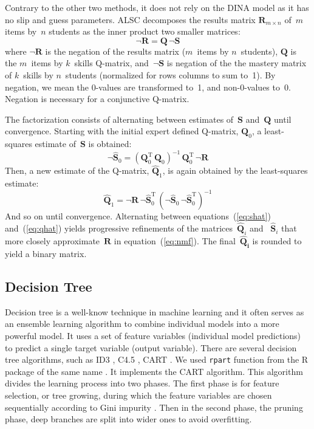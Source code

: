 \documentclass{edm_template}
\begin{document}
Contrary to the other two methods, it does not rely on the DINA model as it has no slip and guess parameters.  ALSC decomposes the results matrix $\mathbf{R}_{m \times n}$ of~$m$ items by~$n$ students as the inner product two smaller matrices:
\begin{equation}
  \mathbf{\neg {R}} = \mathbf{Q} \, \neg \mathbf{S} \label{eq:nmf}
\end{equation}
where $\neg \mathbf{R}$ is the negation of the results matrix ($m$~items by $n$~students),  $\mathbf{Q}$ is the $m$~items by $k$~skills Q-matrix, and~$\neg \mathbf{S}$ is negation of the the mastery matrix of $k$~skills by $n$~students (normalized for rows columns to sum to~1).  By negation, we mean the 0-values are transformed to~1, and non-0-values to~0.  Negation is necessary for a conjunctive Q-matrix.

The factorization consists of alternating between estimates of~$\mathbf{S}$ and~$\mathbf{Q}$ until convergence.  Starting with the initial expert defined Q-matrix, $\mathbf{{Q}}_0$, a least-squares estimate of~$\mathbf{S}$ is obtained:
\begin{equation}
  \neg \mathbf{\hat{S}}_0 = (\mathbf{Q}_0^{\mathrm{T}}  \, \mathbf{Q}_0)^{-1} \, \mathbf{Q}_0^{\mathrm{T}} \, \neg \mathbf{R} \label{eq:shat}
\end{equation}
Then, a new estimate of the Q-matrix, $\mathbf{\hat{Q}}_1$, is again obtained by the least-squares estimate:
\begin{equation}
  \mathbf{\hat{Q}}_1 = \neg \mathbf{R} \, \neg \mathbf{\hat{S}}_0^{\mathrm{T}} \, (\neg \mathbf{\hat{S}}_0 \, \neg \mathbf{\hat{S}}_0^{\mathrm{T}})^{-1} \label{eq:qhat}
\end{equation}
And so on until convergence.  Alternating between equations~(\ref{eq:shat}) and~(\ref{eq:qhat}) yields progressive refinements of the matrices~$\mathbf{\hat{Q}}_i$ and ~$\mathbf{\hat{S}}_i$ that more closely approximate~$\mathbf{R}$ in equation~(\ref{eq:nmf}).  The final~$\mathbf{\hat{Q}_i}$ is rounded to yield a binary matrix.

\subsection{Decision Tree}

Decision tree is a well-know technique in machine learning and it often serves as an ensemble learning algorithm to combine individual models into a more powerful model. It uses a set of feature variables (individual model predictions) to predict a single target variable (output variable). There are several decision tree algorithms, such as ID3 \cite{quinlan1986induction}, C4.5 \cite{quinlan1993c4}, CART \cite{breiman1984classification}. We used \texttt{rpart} function from the R package of the same name \cite{therneau2015rpart}. It implements the CART algorithm. This algorithm divides the learning process into two phases. The first phase is for feature selection, or tree growing, during which the feature variables are chosen sequentially according to Gini impurity \cite{murphy2012machine}. Then in the second phase, the pruning phase, deep branches are split into wider ones to avoid overfitting. 
\end{document}
